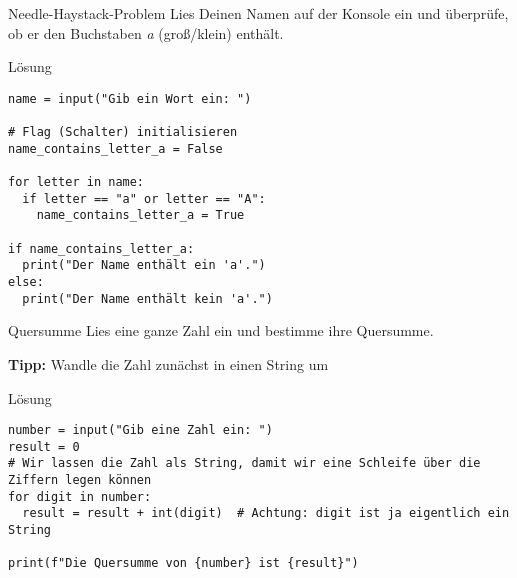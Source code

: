 \begin{fragile}[Übung]
\begin{block}{Needle-Haystack-Problem}
\vspace{2pt}
Lies Deinen Namen auf der Konsole ein und überprüfe, ob er den Buchstaben \emph{a} (groß/klein) enthält. 
\end{block}
\vspace{12pt}
\begin{solutionblock}{Lösung}
\begin{verbatim}
name = input("Gib ein Wort ein: ")

# Flag (Schalter) initialisieren
name_contains_letter_a = False

for letter in name:
  if letter == "a" or letter == "A":
    name_contains_letter_a = True

if name_contains_letter_a:
  print("Der Name enthält ein 'a'.")
else:
  print("Der Name enthält kein 'a'.")
\end{verbatim}
\end{solutionblock}
\end{fragile}



\begin{fragile}
\begin{block}{Quersumme}
	\vspace{2pt}
	Lies eine ganze Zahl  ein und bestimme ihre Quersumme. 
	
	\textbf{Tipp:} Wandle die Zahl zunächst in einen String um \\
\end{block}

\vspace{12pt}

\begin{solutionblock}{Lösung}
\begin{verbatim}
number = input("Gib eine Zahl ein: ")
result = 0
# Wir lassen die Zahl als String, damit wir eine Schleife über die Ziffern legen können
for digit in number:
  result = result + int(digit)  # Achtung: digit ist ja eigentlich ein String

print(f"Die Quersumme von {number} ist {result}")
\end{verbatim}
\end{solutionblock}

\end{fragile}


